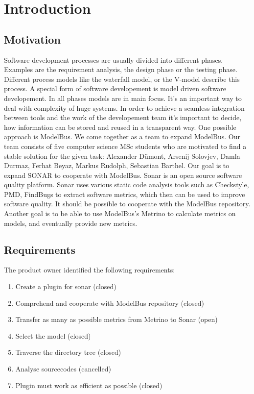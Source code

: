 \chapter{Introduction}
\section{Motivation}
Software development processes are usually divided into different phases. Examples are the requirement analysis, the design phase or the testing phase. Different process models like the waterfall model, or the V-model describe this process. A special form of software developement is model driven software developement. In all phases models are in main focus. It’s an important way to deal with complexity of huge systems. 
In order to achieve a seamless integration between tools and the work of the developement team it’s important to decide, how information can be stored and reused in a transparent way. One possible approach is ModelBus. 
We come together as a team to expand ModelBus.
Our team consists of five computer science MSc students who are motivated to find a stable solution for the given task: Alexander Dümont, Arsenij Solovjev, Damla Durmaz, Ferhat Beyaz, Markus Rudolph, Sebastian Barthel.
Our goal is to expand SONAR to cooperate with ModelBus. 
Sonar is an open source software quality platform. Sonar uses various static code analysis tools such as Checkstyle, PMD, FindBugs to extract software metrics, which then can be used to improve software quality. 
It should be possible to cooperate with the ModelBus repository. Another goal is to be able to use ModelBus’s Metrino to calculate metrics on models, and eventually provide new metrics.

\section{Requirements}
The product owner identified the following requirements:
\begin{enumerate}
\item Create a plugin for sonar (closed)
\item Comprehend and cooperate with ModelBus repository (closed)
\item Transfer as many as possible metrics from Metrino to Sonar (open)
\item Select the model (closed)
\item Traverse the directory tree (closed)
\item Analyse sourcecodes (cancelled)
\item Plugin must work as efficient as possible (closed)
\end{enumerate}

